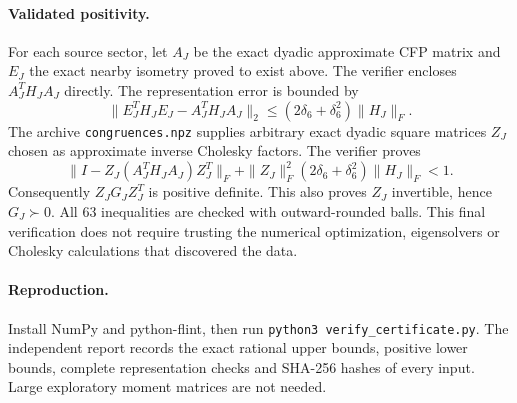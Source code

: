 \documentclass[11pt]{article}
\begin{document}
\paragraph{Validated positivity.}
For each source sector, let $A_J$ be the exact dyadic approximate CFP matrix and $E_J$ the exact nearby isometry proved to exist above. The verifier encloses $A_J^T H_J A_J$ directly. The representation error is bounded by
\[
 \|E_J^TH_JE_J-A_J^TH_JA_J\|_2
 \le(2\delta_6+\delta_6^2)\|H_J\|_F.
\]
The archive \texttt{congruences.npz} supplies arbitrary exact dyadic square matrices $Z_J$ chosen as approximate inverse Cholesky factors. The verifier proves
\[
 \|I-Z_J(A_J^TH_JA_J)Z_J^T\|_F
 +\|Z_J\|_F^2(2\delta_6+\delta_6^2)\|H_J\|_F<1.
\]
Consequently $Z_JG_JZ_J^T$ is positive definite. This also proves $Z_J$ invertible, hence $G_J\succ0$. All 63 inequalities are checked with outward-rounded balls. This final verification does not require trusting the numerical optimization, eigensolvers or Cholesky calculations that discovered the data.

\paragraph{Reproduction.}
Install NumPy and python-flint, then run \texttt{python3 verify\_certificate.py}. The independent report records the exact rational upper bounds, positive lower bounds, complete representation checks and SHA-256 hashes of every input. Large exploratory moment matrices are not needed.
\end{document}
